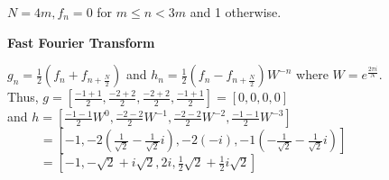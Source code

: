 \documentclass[12pt]{article}
\begin{document}
\begin{list}{.}{}
\begin{list}{)}{}
\item $N=4m, f_n=0$ for $ m \le n < 3m$ and 1 otherwise.
\newline \newline \newline \newline
\newline \newline \newline \newline
\newline \newline \newline \newline
\newline \newline \newline \newline

\end{list}

\item \textbf{Fast Fourier Transform}
\begin{list}{)}{}

\item $g_n = \frac{1}{2}(f_n + f_{n + \frac{N}{2}})$ and
$h_n = \frac{1}{2}(f_n - f_{n + \frac{N}{2}})W^{-n}$ where
$W = e^{\frac{2\pi i}{N}}$.\\
Thus, $g = [\frac{-1 + 1}{2}, \frac{-2 + 2}{2}, \frac{-2 + 2}{2},
\frac{-1 + 1}{2}] = [0, 0, 0, 0]$\\
and $h = [\frac{-1 - 1}{2}W^0, \frac{-2 - 2}{2}W^{-1}, \frac{-2 - 2}{2}W^{-2},
\frac{-1 - 1}{2}W^{-3}]$\\
\verb!     !$=[-1, -2(\frac{1}{\sqrt{2}} - \frac{1}{\sqrt{2}}i),
-2(-i), -1(-\frac{1}{\sqrt{2}} - \frac{1}{\sqrt{2}}i)]$\\
\verb!     !$=[-1, -\sqrt2 +i \sqrt2, 2i, \frac{1}{2}\sqrt2
             + \frac{1}{2}i\sqrt2]$\\

\end{list}

\end{list}
\end{document}
